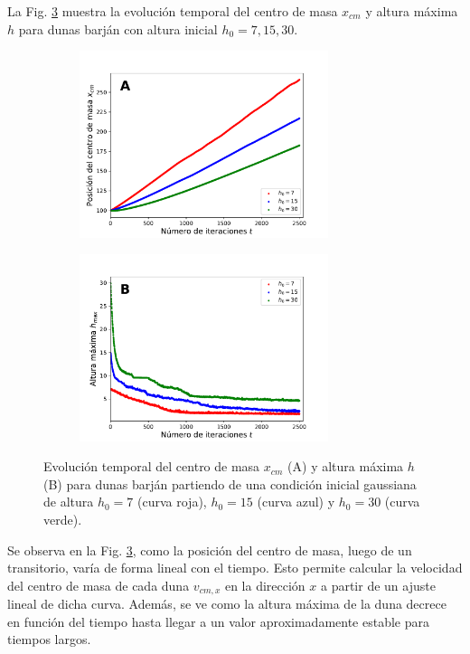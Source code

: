 \documentclass[11pt,twocolumn,twoside]{opticajnl}
\begin{document}
La Fig. \ref{fig:xvst} muestra la evolución temporal del centro de masa $x_{cm}$ y altura máxima $h$ para dunas barján con altura inicial $h_0=7,15,30$. 
\begin{figure}[H]
\centering
     \begin{subfigure}[b]{\linewidth}
        \centering
    \includegraphics[width=0.8\textwidth]{Figuras/xvst.pdf}
         \label{fig:xcmvst}
     \end{subfigure}
     \begin{subfigure}[b]{\linewidth}
     \centering
     \includegraphics[width=0.8\textwidth]{Figuras/hvst.pdf}
         \label{fig:hvst}
     \end{subfigure}
\caption{\centering Evolución temporal del centro de masa $x_{cm}$ (A) y altura máxima $h$ (B) para dunas barján partiendo de una condición inicial gaussiana de altura $h_0=7$ (curva roja), $h_0=15$ (curva azul) y $h_0=30$ (curva verde).}
\label{fig:xvst}
\end{figure}

Se observa en la Fig. \ref{fig:xvst}, como la posición del centro de masa, luego de un transitorio, varía de forma lineal con el tiempo. Esto permite calcular la velocidad del centro de masa de cada duna $v_{cm,x}$ en la dirección $x$ a partir de un ajuste lineal de dicha curva. Además, se ve como la altura máxima de la duna decrece en función del tiempo hasta llegar a un valor aproximadamente estable para tiempos largos. 
\end{document}

